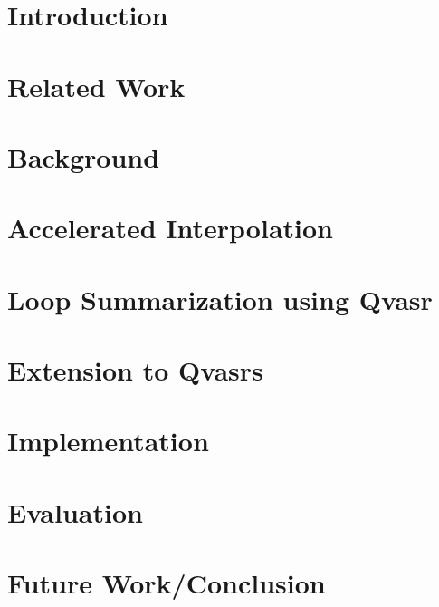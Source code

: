 \documentclass[11pt]{article}
\begin{document}
\newcommand{\HorizontalLine}{\rule{\linewidth}{0.3mm}}



\pagebreak


\pagebreak



\section*{Introduction}


\section*{Related Work}


\section*{Background}


\section*{Accelerated Interpolation}


\section*{Loop Summarization using Qvasr}


\section*{Extension to Qvasrs}


\section*{Implementation}


\section*{Evaluation}


\section*{Future Work/Conclusion}



\pagebreak
{}


\end{document}
